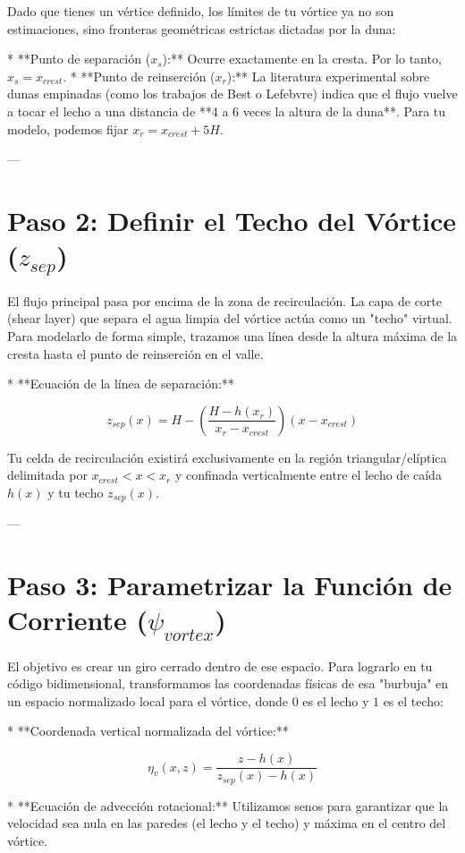 \documentclass[11pt,a4paper]{article}
\begin{document}
Dado que tienes un vértice definido, los límites de tu vórtice ya no son estimaciones, sino fronteras geométricas estrictas dictadas por la duna:

* **Punto de separación ($x_s$):** Ocurre exactamente en la cresta. Por lo tanto, $x_s = x_{crest}$.
* **Punto de reinserción ($x_r$):** La literatura experimental sobre dunas empinadas (como los trabajos de Best o Lefebvre) indica que el flujo vuelve a tocar el lecho a una distancia de **4 a 6 veces la altura de la duna**. Para tu modelo, podemos fijar $x_r = x_{crest} + 5H$.

---

\section{Paso 2: Definir el Techo del Vórtice ($z_{sep}$)}

El flujo principal pasa por encima de la zona de recirculación. La capa de corte (shear layer) que separa el agua limpia del vórtice actúa como un "techo" virtual. Para modelarlo de forma simple, trazamos una línea desde la altura máxima de la cresta hasta el punto de reinserción en el valle.

* **Ecuación de la línea de separación:**

$$z_{sep}(x) = H - \left( \frac{H - h(x_r)}{x_r - x_{crest}} \right) (x - x_{crest})$$



Tu celda de recirculación existirá exclusivamente en la región triangular/elíptica delimitada por $x_{crest} < x < x_r$ y confinada verticalmente entre el lecho de caída $h(x)$ y tu techo $z_{sep}(x)$.

---

\section{Paso 3: Parametrizar la Función de Corriente ($\psi_{vortex}$)}

El objetivo es crear un giro cerrado dentro de ese espacio. Para lograrlo en tu código bidimensional, transformamos las coordenadas físicas de esa "burbuja" en un espacio normalizado local para el vórtice, donde $0$ es el lecho y $1$ es el techo:

* **Coordenada vertical normalizada del vórtice:**

$$\eta_v(x,z) = \frac{z - h(x)}{z_{sep}(x) - h(x)}$$


* **Ecuación de advección rotacional:**
Utilizamos senos para garantizar que la velocidad sea nula en las paredes (el lecho y el techo) y máxima en el centro del vórtice.
\end{document}

